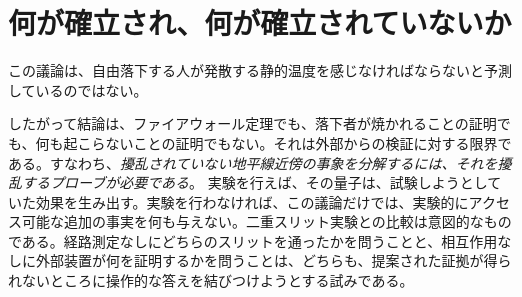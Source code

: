 \begin{classroomqa}
\end{classroomqa}

\enlargethispage{2\baselineskip}
\section{何が確立され、何が確立されていないか}

この議論は、自由落下する人が発散する静的温度を感じなければならないと予測しているのではない。

\begin{classroomqa}
\end{classroomqa}

したがって結論は、ファイアウォール定理でも、落下者が焼かれることの証明でも、何も起こらないことの証明でもない。それは外部からの検証に対する限界である。すなわち、\emph{擾乱されていない地平線近傍の事象を分解するには、それを擾乱するプローブが必要である}。
実験を行えば、その量子は、試験しようとしていた効果を生み出す。実験を行わなければ、この議論だけでは、実験的にアクセス可能な追加の事実を何も与えない。二重スリット実験との比較は意図的なものである。経路測定なしにどちらのスリットを通ったかを問うことと、相互作用なしに外部装置が何を証明するかを問うことは、どちらも、提案された証拠が得られないところに操作的な答えを結びつけようとする試みである。
